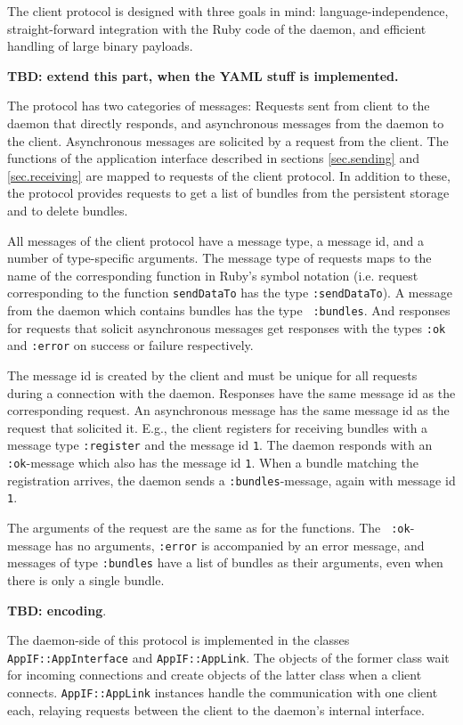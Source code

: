 \documentclass{article}
\begin{document}
The client protocol is designed with three goals in mind: language-independence,
straight-forward integration with the Ruby code of the daemon, and efficient
handling of large binary payloads. 

{\bf TBD: extend this part, when the YAML stuff is implemented.}

The protocol has two categories of messages: Requests sent from client to the
daemon that directly responds, and asynchronous messages from the daemon to the
client. Asynchronous messages are solicited by a request from the client. The
functions of the application interface described in sections \ref{sec.sending}
and \ref{sec.receiving} are mapped to requests of the client protocol. In
addition to these, the protocol provides requests to get a list of bundles from
the persistent storage and to delete bundles.

All messages of the client protocol have a message type, a message id, and a
number of type-specific arguments. The message type of requests maps to the name
of the corresponding function in Ruby's symbol notation (i.e. request
corresponding to the function {\tt sendDataTo} has the type {\tt :sendDataTo}).
A message from the daemon which contains bundles has the type {\tt
:bundles}. And responses for requests that solicit asynchronous messages get
responses with the types {\tt :ok} and {\tt :error} on success or failure
respectively.

The message id is created by the client and must be unique for all requests
during a connection with the daemon. Responses have the same message id as the
corresponding request. An asynchronous message has the same message id as the
request that solicited it. E.g., the client registers for receiving bundles with
a message type {\tt :register} and the message id {\tt 1}. The daemon responds
with an {\tt :ok}-message which also has the message id {\tt 1}. When a bundle
matching the registration arrives, the daemon sends a {\tt :bundles}-message,
again with message id {\tt 1}.

The arguments of the request are the same as for the functions. The {\tt
:ok}-message has no arguments, {\tt :error} is accompanied by an error message,
and messages of type {\tt :bundles} have a list of bundles as their arguments,
even when there is only a single bundle.

{\bf TBD: encoding}.

The daemon-side of this protocol is implemented in the classes {\tt
AppIF::AppInterface} and {\tt AppIF::AppLink}. The objects of the former class
wait for incoming connections and create objects of the latter class when a
client connects. {\tt AppIF::AppLink} instances handle the communication with
one client each, relaying requests between the client to the daemon's internal
interface.
\end{document}
